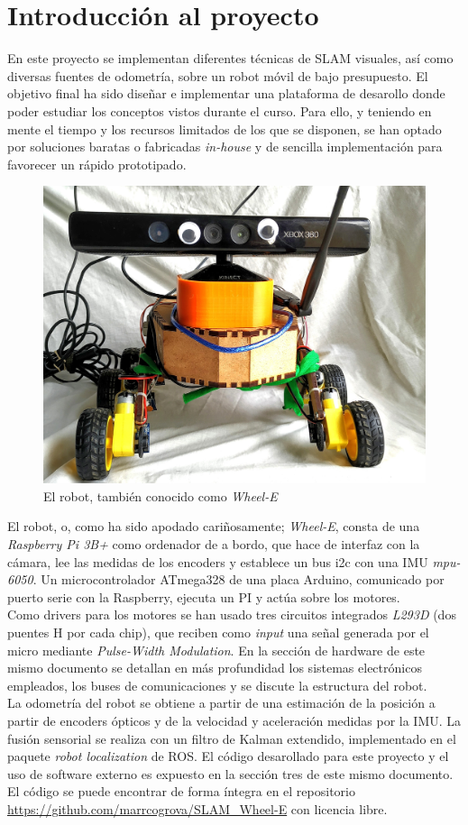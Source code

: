 \documentclass[a4paper,twoside]{article}
\begin{document}
\section{Introducción al proyecto}
En este proyecto se implementan diferentes técnicas de SLAM visuales, así como diversas fuentes de odometría, sobre un robot móvil de bajo presupuesto. El objetivo final ha
sido diseñar e implementar una plataforma de desarollo donde poder estudiar los conceptos vistos durante el curso. Para ello, y teniendo en mente el tiempo y los recursos 
limitados de los que se disponen, se han optado por soluciones baratas o fabricadas \textit{in-house} y de sencilla implementación para favorecer un rápido prototipado.
\begin{figure}[h!]
	\centering
	\includegraphics[width=.6\textwidth]{images/wheele_real}
	\caption{El robot, también conocido como \textit{Wheel-E}}
\end{figure}

El robot, o, como ha sido apodado cariñosamente; \textit{Wheel-E}, consta de una \textit{Raspberry Pi 3B+} como ordenador de a bordo, que hace de interfaz con la cámara, lee 
las medidas de los encoders y establece un bus i2c con una IMU \textit{mpu-6050}. Un microcontrolador ATmega328 de una placa Arduino, comunicado por puerto serie con la
Raspberry, ejecuta un PI y actúa sobre los motores.\\


Como drivers para los motores se han usado tres circuitos integrados \textit{L293D} (dos puentes H por cada chip), que reciben como \textit{input}
una señal generada por el micro mediante \textit{Pulse-Width Modulation}. En la sección de hardware de este mismo documento se detallan en más profundidad los sistemas
electrónicos empleados, los buses de comunicaciones y se discute la estructura del robot.\\
La odometría del robot se obtiene a partir de una estimación de la posición a partir de encoders ópticos y de la velocidad y aceleración medidas por la IMU. La fusión
sensorial se realiza con un filtro de Kalman extendido, implementado en el paquete \textit{robot localization} de ROS. El código desarollado para este proyecto y el uso de 
software externo es expuesto en la sección tres de este mismo documento.\\ 
El código se puede encontrar de forma íntegra en el repositorio \url{https://github.com/marrcogrova/SLAM_Wheel-E} con licencia libre.\\
\end{document}

